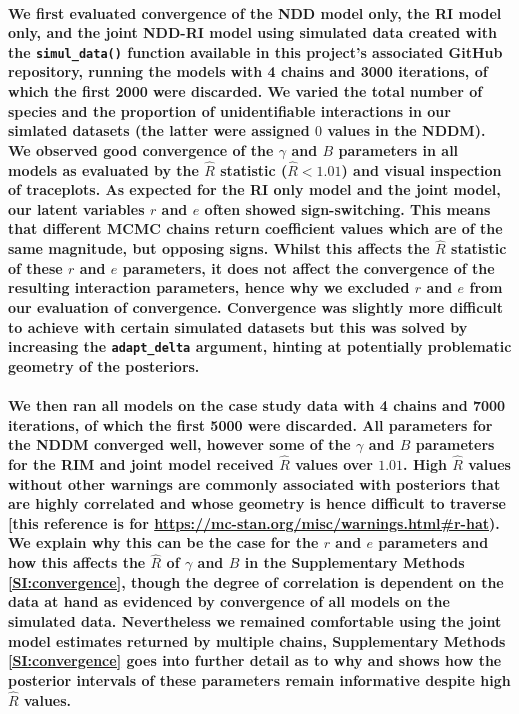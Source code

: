 \documentclass[a4,12pt]{article}
\begin{document}
\begin{refsection}
        \paragraph{}
        \textbf{We first evaluated convergence of the NDD model only, the RI model only, and the joint NDD-RI model using simulated data created with the \texttt{simul\_data()} function available in this project's associated GitHub repository, running the models with 4 chains and 3000 iterations, of which the first 2000 were discarded. We varied the total number of species and the proportion of unidentifiable interactions in our simlated datasets (the latter were assigned $0$ values in the NDDM). We observed good convergence of the $\gamma$ and $B$ parameters in all models as evaluated by the $\hat{R}$ statistic ($\hat{R} < 1.01$) and visual inspection of traceplots. As expected for the RI only model and the joint model, our latent variables $r$ and $e$ often showed sign-switching. This means that different MCMC chains return coefficient values which are of the same magnitude, but opposing signs. Whilst this affects the $\hat{R}$ statistic of these $r$ and $e$ parameters, it does not affect the convergence of the resulting interaction parameters, hence why we excluded $r$ and $e$ from our evaluation of convergence. Convergence was slightly more difficult to achieve with certain simulated datasets but this was solved by increasing the \texttt{adapt\_delta}  argument, hinting at potentially problematic geometry of the posteriors.}

        \paragraph{}
        \textbf{We then ran all models on the case study data with 4 chains and 7000 iterations, of which the first 5000 were discarded. All parameters for the NDDM converged well, however some of the $\gamma$ and $B$ parameters for the RIM and joint model received $\hat{R}$ values over $1.01$. High $\hat{R}$ values without other warnings are commonly associated with posteriors that are highly correlated and whose geometry is hence difficult to traverse \parencite{Team2022} [this reference is for \url{https://mc-stan.org/misc/warnings.html#r-hat}). We explain why this can be the case for the $r$ and $e$ parameters and how this affects the $\hat{R}$ of $\gamma$ and $B$ in the Supplementary Methods \ref{SI:convergence}, though the degree of correlation is dependent on the data at hand as evidenced by convergence of all models on the simulated data. Nevertheless we remained comfortable using the joint model estimates returned by multiple chains, Supplementary Methods \ref{SI:convergence} goes into further detail as to why and shows how the posterior intervals of these parameters remain informative despite high $\hat{R}$ values.}




\end{refsection}
\end{document}
